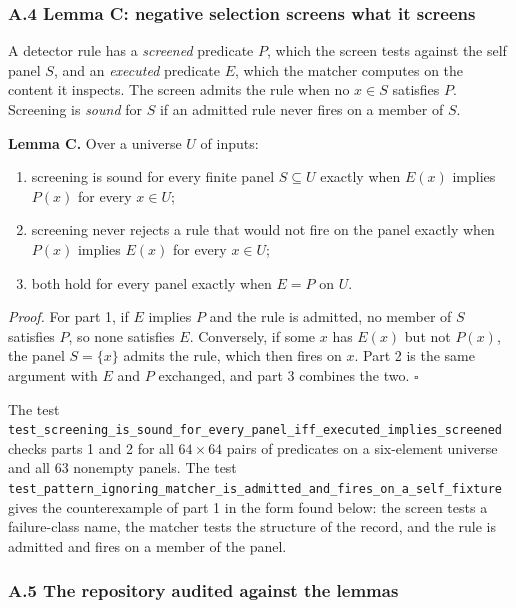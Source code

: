 \documentclass[
  11pt,
]{article}
\providecommand{\tightlist}{%
  \setlength{\itemsep}{0pt}\setlength{\parskip}{0pt}}
\begin{document}
\subsubsection{A.4 Lemma C: negative selection screens what it
screens}\label{a.4-lemma-c-negative-selection-screens-what-it-screens}

A detector rule has a \emph{screened} predicate \(P\), which the screen
tests against the self panel \(S\), and an \emph{executed} predicate
\(E\), which the matcher computes on the content it inspects. The screen
admits the rule when no \(x \in S\) satisfies \(P\). Screening is
\emph{sound} for \(S\) if an admitted rule never fires on a member of
\(S\).

\textbf{Lemma C.} Over a universe \(U\) of inputs:

\begin{enumerate}
\def\labelenumi{\arabic{enumi}.}
\tightlist
\item
  screening is sound for every finite panel \(S \subseteq U\) exactly
  when \(E(x)\) implies \(P(x)\) for every \(x \in U\);
\item
  screening never rejects a rule that would not fire on the panel
  exactly when \(P(x)\) implies \(E(x)\) for every \(x \in U\);
\item
  both hold for every panel exactly when \(E = P\) on \(U\).
\end{enumerate}

\emph{Proof.} For part 1, if \(E\) implies \(P\) and the rule is
admitted, no member of \(S\) satisfies \(P\), so none satisfies \(E\).
Conversely, if some \(x\) has \(E(x)\) but not \(P(x)\), the panel
\(S = \{x\}\) admits the rule, which then fires on \(x\). Part 2 is the
same argument with \(E\) and \(P\) exchanged, and part 3 combines the
two. \(\square\)

The test
\nolinkurl{test_screening_is_sound_for_every_panel_iff_executed_implies_screened}
checks parts 1 and 2 for all \(64 \times 64\) pairs of predicates on a
six-element universe and all 63 nonempty panels. The test
\nolinkurl{test_pattern_ignoring_matcher_is_admitted_and_fires_on_a_self_fixture}
gives the counterexample of part 1 in the form found below: the screen
tests a failure-class name, the matcher tests the structure of the
record, and the rule is admitted and fires on a member of the panel.

\subsubsection{A.5 The repository audited against the
lemmas}\label{a.5-the-repository-audited-against-the-lemmas}
\end{document}
